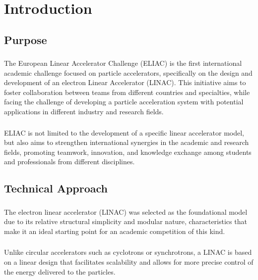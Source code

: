 
\renewcommand{\thesection}{I}
\section{Introduction}

\subsection{Purpose}

\subsubsection{}
The European Linear Accelerator Challenge (ELIAC) is the first international academic challenge focused on particle accelerators, specifically on the design and development of an electron Linear Accelerator (LINAC). This initiative aims to foster collaboration between teams from different countries and specialties, while facing the challenge of developing a particle acceleration system with potential applications in different industry and research fields.

\subsubsection{}
ELIAC is not limited to the development of a specific linear accelerator model, but also aims to strengthen international synergies in the academic and research fields, promoting teamwork, innovation, and knowledge exchange among students and professionals from different disciplines.

\subsection{Technical Approach}

\subsubsection{}
The electron linear accelerator (LINAC) was selected as the foundational model due to its relative structural simplicity and modular nature, characteristics that make it an ideal starting point for an academic competition of this kind.

\subsubsection{}
Unlike circular accelerators such as cyclotrons or synchrotrons, a LINAC is based on a linear design that facilitates scalability and allows for more precise control of the energy delivered to the particles.


